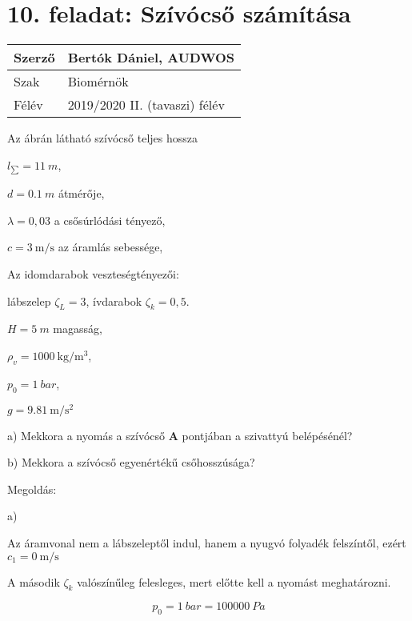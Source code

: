 \section*{10. feladat: Szívócső számítása}




\begin{tabular}{ | p{2cm} | p{14cm} | } 
	\hline
	Szerző & Bertók Dániel, AUDWOS \\ 
	\hline
	Szak & Biomérnök \\ 
	\hline
	Félév & 2019/2020 II. (tavaszi) félév \\ 
	\hline
\end{tabular}
\vspace{0.5cm}


\noindent Az ábrán látható szívócső teljes hossza

$l_\sum= \SI{11}{m}$,

$d= \SI{0,1}{m}$ átmérője,

$\lambda= 0,03$ a csősúrlódási tényező,

$c= \SI{3}{\meter\per\second}$ az áramlás sebessége,

Az idomdarabok veszteségtényezői:

lábszelep $\zeta_L= 3$, ívdarabok $\zeta_k= 0,5$.

$H= \SI{5}{m}$ magasság,

$\rho_v= \SI{1000}{\kilogram\per\meter\cubed}$,

$p_0= \SI{1}{bar}$,

$g= \SI{9,81}{\meter\per\second\squared}$ 

\noindent a) Mekkora a nyomás a szívócső \textbf{A} pontjában a szivattyú belépésénél?

\noindent b) Mekkora a szívócső egyenértékű csőhosszúsága?




\noindent\hrulefill


\noindent Megoldás:

\noindent a)

\noindent Az áramvonal nem a lábszeleptől indul, hanem a nyugvó folyadék felszíntől, ezért $c_1= \SI{0}{\meter\per\second}$

\noindent A második  $\zeta_k$ valószínűleg felesleges, mert előtte kell a nyomást meghatározni.

\begin{equation}
p_0=\SI{1}{bar}=\SI{100000}{Pa}
\end{equation}

